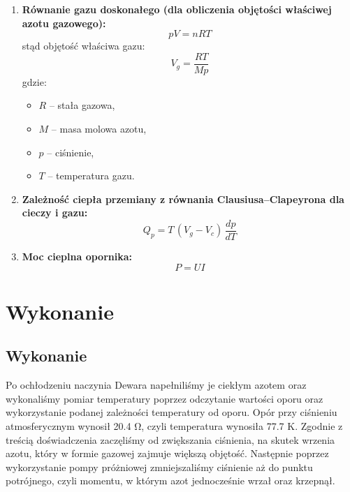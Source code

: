 \documentclass{fizykalab}
\begin{document}
\begin{enumerate}
    \item \textbf{Równanie gazu doskonałego (dla obliczenia objętości właściwej azotu gazowego):}
    \begin{equation}
        pV = nRT
        \label{eq:ideal_gas}
    \end{equation}
    stąd objętość właściwa gazu:
    \begin{equation}
        V_g = \frac{RT}{M p}
        \label{eq:v_specific}
    \end{equation}
    gdzie:
    \begin{itemize}
        \item $R$ – stała gazowa,
        \item $M$ – masa molowa azotu,
        \item $p$ – ciśnienie,
        \item $T$ – temperatura gazu.
    \end{itemize}

    \item \textbf{Zależność ciepła przemiany z równania Clausiusa–Clapeyrona dla cieczy i gazu:}
    \begin{equation}
        Q_p = T \, (V_g - V_c) \, \frac{dp}{dT}
    \end{equation}

    \item \textbf{Moc cieplna opornika:}
    \begin{equation}
        P = U I
        \label{eq:power}
    \end{equation}

\end{enumerate}

\pagebreak
\section{Wykonanie}
\subsection{Wykonanie}

Po ochłodzeniu naczynia Dewara napełniliśmy je ciekłym azotem oraz wykonaliśmy pomiar temperatury
poprzez odczytanie wartości oporu oraz wykorzystanie
podanej zależności temperatury od oporu. Opór przy
ciśnieniu atmosferycznym wynosił 20.4 Ω, czyli temperatura wynosiła 77.7 K. Zgodnie z treścią doświadczenia
zaczęliśmy od zwiększania ciśnienia, na skutek wrzenia
azotu, który w formie gazowej zajmuje większą objętość. Następnie poprzez wykorzystanie pompy próżniowej zmniejszaliśmy ciśnienie aż do punktu potrójnego,
czyli momentu, w którym azot jednocześnie wrzał oraz
krzepnął.
\end{document}

